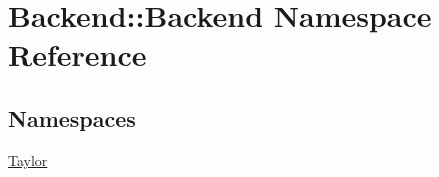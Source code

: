 \hypertarget{namespaceBackend_1_1Backend}{\section{Backend\+:\+:Backend Namespace Reference}
\label{namespaceBackend_1_1Backend}
}
\subsection*{Namespaces}
\begin{DoxyCompactItemize}
\item 
 \hyperlink{namespaceBackend_1_1Backend_1_1Taylor}{Taylor}
\end{DoxyCompactItemize}
